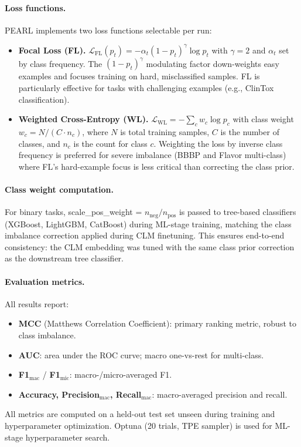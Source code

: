 \documentclass[9pt,a4paper]{article}
\begin{document}
\paragraph{Loss functions.}
PEARL implements two loss functions selectable per run:

\begin{itemize}[leftmargin=2em]
\item \textbf{Focal Loss (FL).}
  $\mathcal{L}_\text{FL}(p_t) = -\alpha_t (1 - p_t)^\gamma \log p_t$
  with $\gamma = 2$ and $\alpha_t$ set by class frequency.
  The $(1 - p_t)^\gamma$ modulating factor down-weights easy examples and focuses
  training on hard, misclassified samples.
  FL is particularly effective for tasks with challenging
  examples (e.g., ClinTox classification).

\item \textbf{Weighted Cross-Entropy (WL).}
  $\mathcal{L}_\text{WL} = -\sum_c w_c \log p_c$
  with class weight $w_c = N / (C \cdot n_c)$, where $N$ is total training samples,
  $C$ is the number of classes, and $n_c$ is the count for class $c$.
  Weighting the loss by inverse class frequency is preferred for severe imbalance
  (BBBP and Flavor multi-class) where FL's hard-example focus is less critical
  than correcting the class prior.
\end{itemize}

\paragraph{Class weight computation.}
For binary tasks, scale\_pos\_weight = $n_\text{neg} / n_\text{pos}$ is passed to
tree-based classifiers (XGBoost, LightGBM, CatBoost) during ML-stage training,
matching the class imbalance correction applied during CLM finetuning.
This ensures end-to-end consistency: the CLM embedding was tuned with the same
class prior correction as the downstream tree classifier.

\paragraph{Evaluation metrics.}
All results report:
\begin{itemize}[leftmargin=2em]
  \item \textbf{MCC} (Matthews Correlation Coefficient): primary ranking metric,
    robust to class imbalance.
  \item \textbf{AUC}: area under the ROC curve; macro one-vs-rest for multi-class.
  \item \textbf{F1$_\text{mac}$} / \textbf{F1$_\text{mic}$}: macro-/micro-averaged F1.
  \item \textbf{Accuracy, Precision$_\text{mac}$, Recall$_\text{mac}$}:
    macro-averaged precision and recall.
\end{itemize}
All metrics are computed on a held-out test set unseen during training and
hyperparameter optimization.
Optuna (20 trials, TPE sampler) is used for ML-stage hyperparameter search.
\end{document}
